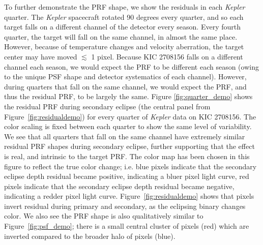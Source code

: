 \documentclass[iop]{emulateapj}
\newcommand{\kepler}{\emph{Kepler}\xspace}
\newcommand{\ch}[1]{\textcolor{red}{\texttt{#1}}\xspace}
\newcommand{\target}{KIC 2708156\xspace}
\begin{document}
To further demonstrate the PRF shape, we show the residuals in each \kepler quarter. The \kepler spacecraft rotated 90 degrees every quarter, and so each target falls on a different channel of the detector every season. Every fourth quarter, the target will fall on the same channel, in almost the same place. However, because of temperature changes and velocity aberration, the target center may have moved $\lesssim$ 1 pixel. Because \target falls on a different channel each season, we would expect the PRF to be different each season (owing to the unique PSF shape and detector systematics of each channel). However, during quarters that fall on the same channel, we would expect the PRF, and thus the residual PRF, to be largely the same. Figure \ref{fig:quarter_demo} shows the residual PRF during secondary eclipse (the central panel from Figure~\ref{fig:residualdemo}) for every quarter of \kepler data on \target. The color scaling is fixed between each quarter to show the same level of variability. We see that all quarters that fall on the same channel have extremely similar residual PRF shapes during secondary eclipse, further supporting that the effect is real, and intrinsic to the target PRF. The color map has been chosen in this figure to reflect the true color change; i.e. blue pixels indicate that the secondary eclipse depth residual became positive, indicating a bluer pixel light curve, red pixels indicate that the secondary eclipse depth residual became negative, indicating a redder pixel light curve. Figure~\ref{fig:residualdemo} shows that pixels invert residual during primary and secondary, as the eclipsing binary changes color. We also see the PRF shape is also qualitatively similar to Figure~\ref{fig:psf_demo}; there is a small central cluster of pixels (red) which are inverted compared to the broader halo of pixels (blue).


\end{document}
